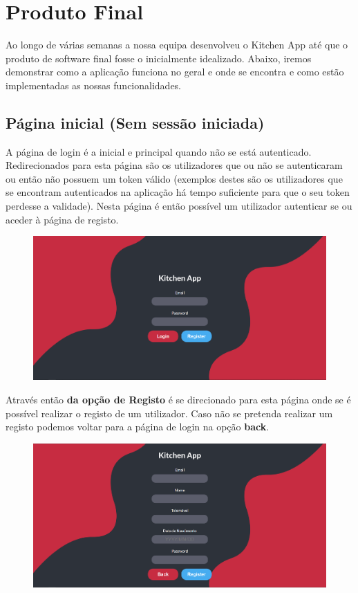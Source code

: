 \documentclass[a4paper]{report}
\begin{document}
\chapter{Produto Final}

    Ao longo de várias semanas a nossa equipa desenvolveu o Kitchen App até que
    o produto de software final fosse o inicialmente idealizado. Abaixo, iremos
    demonstrar como a aplicação funciona no geral e onde se encontra e como
    estão implementadas as nossas funcionalidades.

    \section{Página inicial (Sem sessão iniciada)}
    A página de login é a inicial e principal quando não se está 
    autenticado. Redirecionados para esta página são os utilizadores que
    ou não se autenticaram ou então não possuem um token válido (exemplos destes 
    são os utilizadores que se encontram autenticados na aplicação há tempo
    suficiente para que o seu token perdesse a validade). Nesta página é 
    então possível um utilizador autenticar se ou aceder à página de registo.

    \begin{figure}[H]
        \centering
            \includegraphics[width=\textwidth]{images/produto_final/login.png}
    \end{figure}

    Através então \textbf{da opção de Registo} é se direcionado para esta 
    página onde se é possível realizar o registo de um utilizador. Caso 
    não se pretenda realizar um registo podemos voltar para a página de login
    na opção \textbf{back}.

    \begin{figure}[H]
        \centering
            \includegraphics[width=\textwidth]{images/produto_final/registo.png}
    \end{figure}
\end{document}
